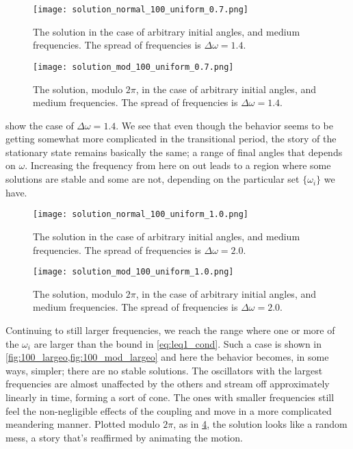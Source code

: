 \documentclass[10pt,a4paper,twocolumn]{article}
\begin{document}
\begin{figure}[!h]
    \centering
    \texttt{[image: solution\_normal\_100\_uniform\_0.7.png]}
    \caption{The solution in the case of arbitrary initial angles, and medium frequencies. The spread of frequencies is $\Delta \omega = 1.4$.}
    \label{fig:100_mediumo}
\end{figure}

\begin{figure}[!h]
    \centering
    \texttt{[image: solution\_mod\_100\_uniform\_0.7.png]}
    \caption{The solution, modulo $2\pi$, in the case of arbitrary initial angles, and medium frequencies. The spread of frequencies is $\Delta \omega = 1.4$.}
    \label{fig:100_mod_mediumo}
\end{figure}

 show the case of $\Delta \omega = 1.4$. We see that even though the behavior seems to be getting somewhat more complicated in the transitional period, the story of the stationary state remains basically the same; a range of final angles that depends on $\omega$. Increasing the frequency from here on out leads to a region where some solutions are stable and some are not, depending on the particular set $\{\omega_i\}$ we have.


\begin{figure}[!h]
    \centering
    \texttt{[image: solution\_normal\_100\_uniform\_1.0.png]}
    \caption{The solution in the case of arbitrary initial angles, and medium frequencies. The spread of frequencies is $\Delta \omega = 2.0$.}
    \label{fig:100_largeo}
\end{figure}

\begin{figure}[!h]
    \centering
    \texttt{[image: solution\_mod\_100\_uniform\_1.0.png]}
    \caption{The solution, modulo $2\pi$, in the case of arbitrary initial angles, and medium frequencies. The spread of frequencies is $\Delta \omega = 2.0$.}
    \label{fig:100_mod_largeo}
\end{figure}

Continuing to still larger frequencies, we reach the range where one or more of the $\omega_i$ are larger than the bound in \cref{eq:leq1_cond}. Such a case is shown in \cref{fig:100_largeo,fig:100_mod_largeo} and here the behavior becomes, in some ways, simpler; there are no stable solutions. The oscillators with the largest frequencies are almost unaffected by the others and stream off approximately linearly in time, forming a sort of cone. The ones with smaller frequencies still feel the non-negligible effects of the coupling and move in a more complicated meandering manner. Plotted modulo $2\pi$, as in \cref{fig:100_mod_largeo}, the solution looks like a random mess, a story that's reaffirmed by animating the motion.
\end{document}
